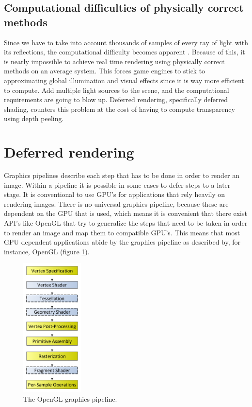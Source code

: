 \documentclass{ACGSeminar}
\begin{document}
	\subsection{Computational difficulties of physically correct methods}
	Since we have to take into account thousands of samples of every ray of light with its reflections, the computational difficulty becomes apparent \cite{DST}. Because of this, it is nearly impossible to achieve real time rendering using physically correct methods on an average system. This forces game engines to stick to approximating global illumination and visual effects since it is way more efficient to compute. Add multiple light sources to the scene, and the computational requirements are going to blow up. Deferred rendering, specifically deferred shading, counters this problem at the cost of having to compute transparency using depth peeling.

\section{Deferred rendering}
	Graphics pipelines describe each step that has to be done in order to render an image. Within a pipeline it is possible in some cases to defer steps to a later stage. It is conventional to use GPU's for applications that rely heavily on rendering images. There is no universal graphics pipeline, because these are dependent on the GPU that is used, which means it is convenient that there exist API's like OpenGL that try to generalize the steps that need to be taken in order to render an image and map them to compatible GPU's. This means that most GPU dependent applications abide by the graphics pipeline as described by, for instance, OpenGL (figure \ref{fig:graphics_pipeline}).
	\begin{figure}[htb!]%
	\begin{center}%
		\includegraphics[height=7cm]{img/graphics_pipeline.png}
	\end{center}%
	\caption{The OpenGL graphics pipeline.}%
	\label{fig:graphics_pipeline}%
	\end{figure}%
\end{document}
